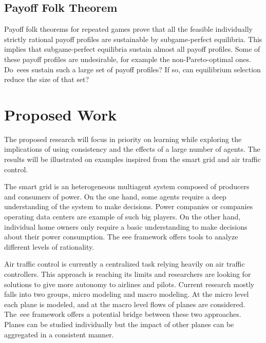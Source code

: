 \subsection{Payoff Folk Theorem}
Payoff folk theorems for repeated games prove that all the feasible individually strictly rational payoff profiles are sustainable by subgame-perfect equilibria.
This implies that subgame-perfect equilibria sustain almost all payoff profiles.
Some of these payoff profiles are undesirable, for example the non-Pareto-optimal ones.
Do~\acp{eee} sustain such a large set of payoff profiles?
If so, can equilibrium selection  reduce the size of that set?

\section{Proposed Work}
The proposed research will focus in priority on learning while exploring the implications of using consistency and the effects of a large number of agents.
The results will be illustrated on examples inspired from the smart grid and air traffic control.

The smart grid is an heterogeneous multiagent system composed of producers and consumers of power.
On the one hand, some agents require a deep understanding of the system to make decisions.
Power companies or companies operating data centers are example of such big players.
On the other hand, individual home owners only require a basic understanding to make decisions about their power consumption.
The \ac{eee} framework offers tools to analyze different levels of rationality.

Air traffic control is currently a centralized task relying heavily on air traffic controllers.
This approach is reaching its limits and researchers are looking for solutions to give more autonomy to airlines and pilots.
Current research mostly falls into two groups, micro modeling and macro modeling.
At the micro level each plane is modeled, and at the macro level flows of planes are considered.
The~\ac{eee} framework offers a potential bridge between these two approaches.
Planes can be studied individually but the impact of other planes can be aggregated in a consistent manner.
